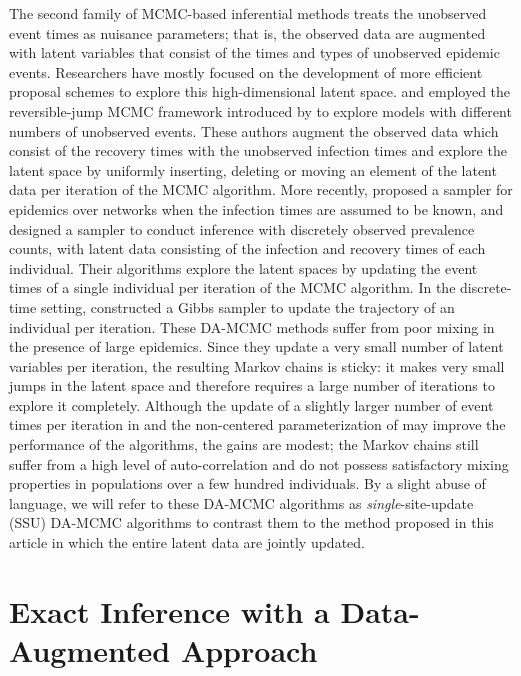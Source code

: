 \documentclass[12pt]{article}
\begin{document}
The second family of MCMC-based inferential methods treats the unobserved event times as nuisance parameters; that is, the observed data are augmented with latent variables that consist of the times and types of unobserved epidemic events.
Researchers have mostly focused on the development of more efficient proposal schemes to explore this high-dimensional latent space. \cite{Gibson.1998} and \cite{ONeill.1999} employed the reversible-jump MCMC framework introduced by \cite{Green.1995} to explore models with different numbers of unobserved events. These authors augment the observed data which consist of the recovery times with the unobserved infection times and explore the latent space by uniformly inserting, deleting or moving an element of the latent data per iteration of the MCMC algorithm. 
More recently, \cite{Bu.2020} proposed a sampler for epidemics over networks when the infection times are assumed to be known, and \cite{Fintzi.2017} designed a sampler to conduct inference with discretely observed prevalence counts, with latent data consisting of the infection and recovery times of each individual. Their algorithms explore the latent spaces by updating the event times of a single individual per iteration of the MCMC algorithm. %
In the discrete-time setting, \cite{Touloupou.2020} constructed a Gibbs sampler to update the trajectory of an individual per iteration.
These DA-MCMC methods suffer from poor mixing in the presence of large epidemics. Since they update a very small number of latent variables per iteration, the resulting Markov chains is sticky: it makes very small jumps in the latent space and therefore requires a large number of iterations to explore it completely.
Although the update of a slightly larger number of event times per iteration in \cite{Pooley.2015} and the non-centered parameterization of \cite{Neal.2005} may improve the performance of the algorithms, the gains are modest; the Markov chains still suffer from a high level of auto-correlation and do not possess satisfactory mixing properties in populations over a few hundred individuals.
By a slight abuse of language, we will refer to these DA-MCMC algorithms as \textit{single}-site-update (SSU) DA-MCMC algorithms to contrast them to the method proposed in this article in which the entire latent data are jointly updated.

\section{Exact Inference with a  Data-Augmented Approach}
\label{sec:con}
\end{document}
